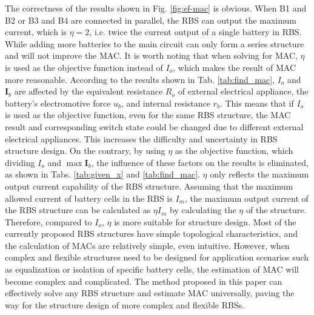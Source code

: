 \documentclass{article}
\begin{document}
The correctness of the results shown in Fig. \ref{fig:ef-mac} is obvious. 
When B1 and B2 or B3 and B4 are connected in parallel, the RBS can output the maximum current, which is $\eta=2$, i.e. twice the current output of a single battery in RBS.
While adding more batteries to the main circuit can only form a series structure and will not improve the MAC.
It is worth noting that when solving for MAC, $\eta$ is used as the objective function instead of $I_o$, which makes the result of MAC more reasonable. 
According to the results shown in Tab. \ref{tab:find_mac}, $I_o$ and $\bm{I}_b$ are affected by the equivalent resistance $R_o$ of external electrical appliance, the battery's electromotive force $u_b$, and internal resistance $r_b$. 
This means that if $I_o$ is used as the objective function, even for the same RBS structure, the MAC result and corresponding switch state could be changed due to different external electrical appliances. 
This increases the difficulty and uncertainty in RBS structure design. 
On the contrary, by using $\eta$ as the objective function, which dividing $I_o$ and $\max\bm{I}_b$, the influence of these factors on the results is eliminated, as shown in Tabs. \ref{tab:given_x} and \ref{tab:find_mac}.
$\eta$ only reflects the maximum output current capability of the RBS structure.
Assuming that the maximum allowed current of battery cells in the RBS is $I_m$, the maximum output current of the RBS structure can be calculated as $\eta I_m$ by calculating the $\eta$ of the structure. 
Therefore, compared to $I_o$, $\eta$ is more suitable for structure design. 
Most of the currently proposed RBS structures have simple topological characteristics, and the calculation of MACs are relatively simple, even intuitive. 
However, when complex and flexible structures need to be designed for application scenarios such as equalization or isolation of specific battery cells, the estimation of MAC will become complex and complicated. 
The method proposed in this paper can effectively solve any RBS structure and estimate MAC universally, paving the way for the structure design of more complex and flexible RBSs.


\end{document}
